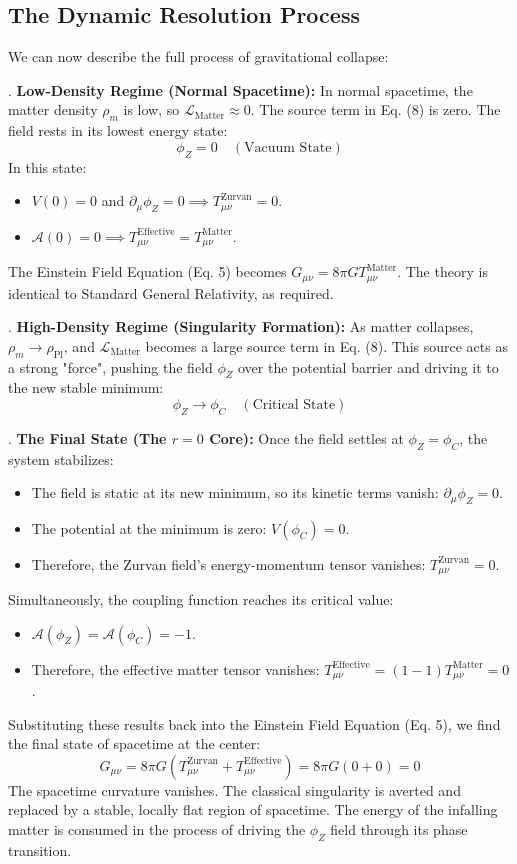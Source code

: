 \documentclass[12pt, a4paper]{article}
\newcommand{\phiZ}{\phi_Z}
\newcommand{\Lmat}{\mathcal{L}_{\text{Matter}}}
\newcommand{\Tmat}{T_{\mu\nu}^{\text{Matter}}}
\newcommand{\Teff}{T_{\mu\nu}^{\text{Effective}}}
\newcommand{\Tzurvan}{T_{\mu\nu}^{\text{Zurvan}}}
\newcommand{\Aphi}{\mathcal{A}(\phiZ)}
\newcommand{\phiC}{\phi_C}
\newcommand{\rhopl}{\rho_{\text{Pl}}}
\begin{document}
\subsection{The Dynamic Resolution Process}
We can now describe the full process of gravitational collapse:

. \textbf{Low-Density Regime (Normal Spacetime):}
In normal spacetime, the matter density $\rho_m$ is low, so $\Lmat \approx 0$. The source term in Eq. (8) is zero. The field rests in its lowest energy state:
$$ \phiZ = 0 \quad (\text{Vacuum State}) $$
In this state:
\begin{itemize}
    \item $V(0) = 0$ and $\partial_\mu \phiZ = 0 \implies \Tzurvan = 0$.
    \item $\mathcal{A}(0) = 0 \implies \Teff = \Tmat$.
\end{itemize}
The Einstein Field Equation (Eq. 5) becomes $G_{\mu\nu} = 8\pi G \Tmat$. The theory is identical to Standard General Relativity, as required.

. \textbf{High-Density Regime (Singularity Formation):}
As matter collapses, $\rho_m \to \rhopl$, and $\Lmat$ becomes a large source term in Eq. (8). This source acts as a strong "force", pushing the field $\phiZ$ over the potential barrier and driving it to the new stable minimum:
$$ \phiZ \to \phiC \quad (\text{Critical State}) $$

. \textbf{The Final State (The $r=0$ Core):}
Once the field settles at $\phiZ = \phiC$, the system stabilizes:
\begin{itemize}
    \item The field is static at its new minimum, so its kinetic terms vanish: $\partial_\mu \phiZ = 0$.
    \item The potential at the minimum is zero: $V(\phiC) = 0$.
    \item Therefore, the Zurvan field's energy-momentum tensor vanishes: $\Tzurvan = 0$.
\end{itemize}
Simultaneously, the coupling function reaches its critical value:
\begin{itemize}
    \item $\Aphi = \mathcal{A}(\phiC) = -1$.
    \item Therefore, the effective matter tensor vanishes: $\Teff = (1 - 1) \Tmat = 0$.
\end{itemize}
Substituting these results back into the Einstein Field Equation (Eq. 5), we find the final state of spacetime at the center:
\begin{equation}
G_{\mu\nu} = 8\pi G (\Tzurvan + \Teff) = 8\pi G (0 + 0) = 0
\end{equation}
The spacetime curvature vanishes. The classical singularity is averted and replaced by a stable, locally flat region of spacetime. The energy of the infalling matter is consumed in the process of driving the $\phiZ$ field through its phase transition.
\end{document}
